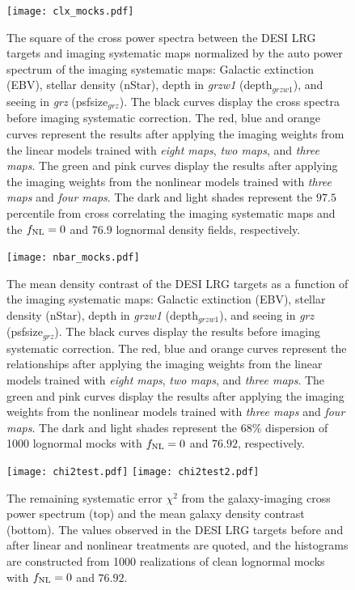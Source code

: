 \begin{figure}
\centering
\texttt{[image: clx\_mocks.pdf]}
\caption{The square of the cross power spectra between the DESI LRG targets and imaging systematic maps normalized by the auto power spectrum of the imaging systematic maps: Galactic extinction (EBV), stellar density (nStar), depth in \textit{grzw1} (depth$_{grzw1}$), and seeing in \textit{grz} (psfsize$_{grz}$). The black curves display the cross spectra before imaging systematic correction. The red, blue and orange curves represent the results after applying the imaging weights from the linear models trained with \textit{eight maps}, \textit{two maps}, and \textit{three maps}. The green and pink curves display the results after applying the imaging weights from the nonlinear models trained with \textit{three maps} and \textit{four maps}. The dark and light shades represent the $97.5$ percentile from cross correlating the imaging systematic maps and the $f_{\rm NL}=0$ and $76.9$ lognormal density fields, respectively.}\label{fig:clxmock}
\end{figure}

\begin{figure}
\centering
\texttt{[image: nbar\_mocks.pdf]}
\caption{The mean density contrast of the DESI LRG targets as a function of the imaging systematic maps: Galactic extinction (EBV), stellar density (nStar), depth in \textit{grzw1} (depth$_{grzw1}$), and seeing in \textit{grz} (psfsize$_{grz}$). The black curves display the results before imaging systematic correction. The red, blue and orange curves represent the relationships after applying the imaging weights from the linear models trained with \textit{eight maps}, \textit{two maps}, and \textit{three maps}. The green and pink curves display the results after applying the imaging weights from the nonlinear models trained with \textit{three maps} and \textit{four maps}. The dark and light shades represent the $68\%$ dispersion of 1000 lognormal mocks with $f_{\rm NL}=0$ and $76.92$, respectively.}\label{fig:nbarmock}
\end{figure}


\begin{figure}
\raggedleft
\texttt{[image: chi2test.pdf]}
\texttt{[image: chi2test2.pdf]}
\caption{The remaining systematic error $\chi^{2}$ from the galaxy-imaging cross power spectrum (top) and the mean galaxy density contrast (bottom). The values observed in the DESI LRG targets before and after linear and nonlinear treatments are quoted, and the histograms are constructed from 1000 realizations of clean lognormal mocks with $f_{\rm NL}=0$ and $76.92$. 
}\label{fig:chi2test}
\end{figure}


